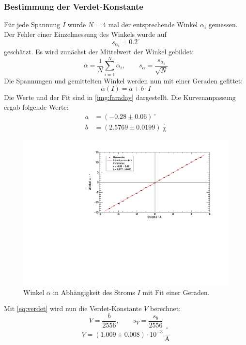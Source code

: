 \subsubsection{Bestimmung der Verdet-Konstante}
Für jede Spannung $I$ wurde $N=4$ mal der entsprechende Winkel $\alpha_i$ gemessen. Der Fehler einer Einzelmessung des Winkels wurde auf
\begin{equation}
  s_{\alpha_i} = 0.2^\circ
\end{equation}  %
geschätzt. Es wird zunächst der Mittelwert der Winkel gebildet:
\begin{equation}
  \alpha = \frac{1}{N} \sum_{i=1}^{N} \alpha_i, \qquad s_{\alpha} = \frac{s_{\alpha_i}}{\sqrt{N}}
\end{equation}
Die Spannungen und gemittelten Winkel werden nun mit einer Geraden gefittet:
\begin{equation}
  \alpha(I) = a + b \cdot I
\end{equation}
Die Werte und der Fit sind in \autoref{img:faraday} dargestellt. Die Kurvenanpassung ergab folgende Werte:
\begin{equation}
\begin{split}
  \label{eq:faraday:params}
  a &= (-0.28 \pm 0.06)\,{}^\circ \\
  b &= (2.5769 \pm 0.0199)\,\frac{{}^\circ}{\text{A}}
\end{split}
\end{equation}
\begin{figure}[H]
\begin{center}
  \includegraphics[width=\textwidth]{../img/faraday.pdf}
  \caption{Winkel $\alpha$ in Abhängigkeit des Stroms $I$ mit Fit einer Geraden.}
  \label{img:faraday}
\end{center}
\end{figure}
Mit \autoref{eq:verdet} wird nun die Verdet-Konstante $V$ berechnet:
\begin{equation}
  \label{eq:eval:verdet}
  V = \frac{b}{2556}, \qquad s_V = \frac{s_b}{2556}
\end{equation}
\begin{equation}
  V = (1.009 \pm 0.008) \cdot 10^{-3}\,\frac{{}^\circ}{\text{A}}
\end{equation}

